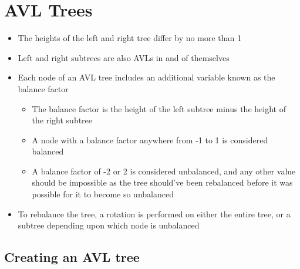 \section*{AVL Trees}

\begin{itemize}
  \item The heights of the left and right tree differ by no more than 1
  \item Left and right subtrees are also AVLs in and of themselves
  \item Each node of an AVL tree includes an additional variable known as the balance factor
  \begin{itemize}
    \item The balance factor is the height of the left subtree minus the height of the right subtree
    \item A node with a balance factor anywhere from -1 to 1 is considered balanced
    \item A balance factor of -2 or 2 is considered unbalanced, and any other value should be impossible as the tree should've been rebalanced before it was possible for it to become so unbalanced
  \end{itemize}
  \item To rebalance the tree, a rotation is performed on either the entire tree, or a subtree depending upon which node is unbalanced
\end{itemize}

\subsection*{Creating an AVL tree}

